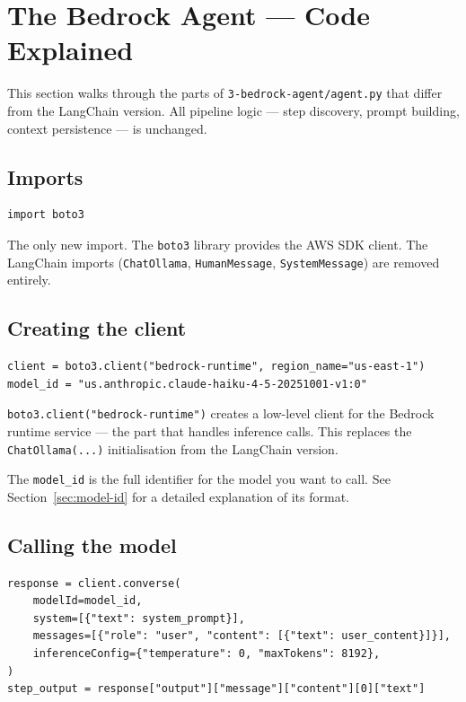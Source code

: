 \documentclass[12pt, a4paper]{article}
\begin{document}
\section{The Bedrock Agent — Code Explained}

This section walks through the parts of \texttt{3-bedrock-agent/agent.py} that differ from the LangChain version. All pipeline logic — step discovery, prompt building, context persistence — is unchanged.

\subsection{Imports}

\begin{lstlisting}[style=pythonstyle]
import boto3
\end{lstlisting}

The only new import. The \texttt{boto3} library provides the AWS SDK client. The LangChain imports (\texttt{ChatOllama}, \texttt{HumanMessage}, \texttt{SystemMessage}) are removed entirely.

\subsection{Creating the client}

\begin{lstlisting}[style=pythonstyle]
client = boto3.client("bedrock-runtime", region_name="us-east-1")
model_id = "us.anthropic.claude-haiku-4-5-20251001-v1:0"
\end{lstlisting}

\texttt{boto3.client("bedrock-runtime")} creates a low-level client for the Bedrock runtime service — the part that handles inference calls. This replaces the \texttt{ChatOllama(...)} initialisation from the LangChain version.

The \texttt{model\_id} is the full identifier for the model you want to call. See Section~\ref{sec:model-id} for a detailed explanation of its format.

\subsection{Calling the model}

\begin{lstlisting}[style=pythonstyle]
response = client.converse(
    modelId=model_id,
    system=[{"text": system_prompt}],
    messages=[{"role": "user", "content": [{"text": user_content}]}],
    inferenceConfig={"temperature": 0, "maxTokens": 8192},
)
step_output = response["output"]["message"]["content"][0]["text"]
\end{lstlisting}
\end{document}
